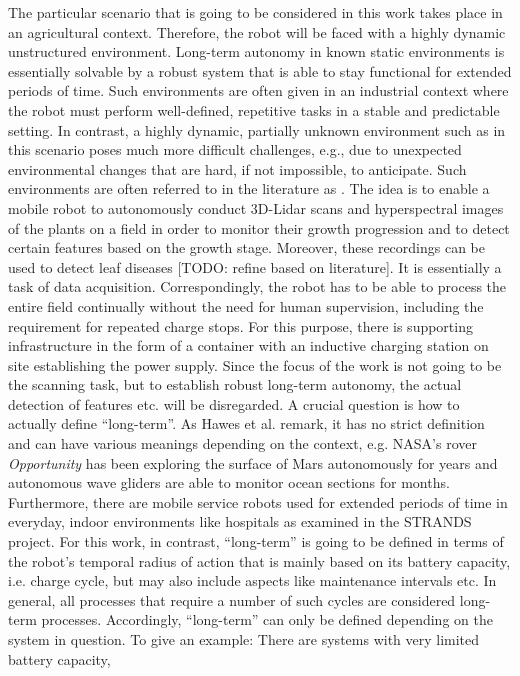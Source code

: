\documentclass[english, master, utf8]{base/thesis_KBS}
\begin{document}
The particular scenario that is going to be considered in this work takes place in an agricultural context. Therefore, the robot will be faced with a highly dynamic unstructured
environment. Long-term autonomy in known static environments is essentially solvable by a robust system that is able to
stay functional for extended periods of time. \cite{Kunze:2018} Such environments are often given in an industrial context where the robot must perform well-defined, repetitive tasks
in a stable and predictable setting. \cite{Bechar:2016}
In contrast, a highly dynamic, partially unknown environment such as in this scenario poses much more difficult
challenges, e.g., due to unexpected environmental changes that are hard, if not impossible, to anticipate.
Such environments are often referred to in the literature as .
The idea is to enable a mobile robot to autonomously conduct 3D-Lidar scans and hyperspectral images of the plants on a field in order to monitor their growth progression and 
to detect certain features based on the growth stage. Moreover, these recordings can be used to detect leaf diseases [TODO: refine based on literature]. It is essentially a task of
data acquisition.
Correspondingly, the robot has to be able to process the entire field continually without the need for human supervision,
including the requirement for repeated charge stops. For this purpose, there is supporting infrastructure in the form of a container with an inductive charging station on site
establishing the power supply. Since the focus of the work is not going to be the scanning task, but to establish robust long-term autonomy, the actual detection of features 
etc. will be disregarded.
A crucial question is how to actually define ``long-term''. As Hawes et al. remark, it has no strict definition and can have various meanings depending
on the context, e.g. NASA's rover \textit{Opportunity} has been exploring the surface of Mars autonomously for years and autonomous wave gliders are able to monitor
ocean sections for months. Furthermore, there are mobile service robots used for extended periods of time in everyday, indoor environments like hospitals 
as examined in the STRANDS project. \cite{Hawes:2017}
For this work, in contrast, ``long-term'' is going to be defined in terms of the robot's temporal radius of action that is mainly based on its battery capacity, i.e. charge cycle,
but may also include aspects like maintenance intervals etc. In general, all processes that require a number of such cycles are considered long-term processes.
Accordingly, ``long-term'' can only be defined depending on the system in question. To give an example: There are systems with very limited battery capacity, 
\end{document}
